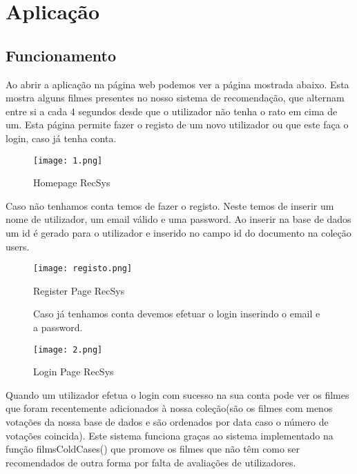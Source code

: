 \section{Aplicação}


\subsection{Funcionamento}

Ao abrir a aplicação na página web podemos ver a página mostrada abaixo. Esta mostra alguns filmes presentes no nosso sistema de recomendação, que alternam entre si a cada 4 segundos desde que o utilizador não tenha o rato em cima de um. Esta página permite fazer o registo de um novo utilizador ou que este faça o login, caso já tenha conta.\newline

\begin{figure}[H]
\centering
\texttt{[image: 1.png]}
\caption {Homepage RecSys}
\label {fig07}
\end{figure}

Caso não tenhamos conta temos de fazer o registo. Neste temos de inserir um nome de utilizador, um email válido e uma password.  Ao inserir na base de dados um id é gerado para o utilizador e inserido no campo id do documento na coleção users.\newline

\begin{figure}[H]
\centering
\texttt{[image: registo.png]}
\caption {Register Page RecSys}
\label {fig08}
\end{figure}

\begin{figure}[H]
Caso já tenhamos conta devemos efetuar o login inserindo o email e a password.\newline

\centering
\texttt{[image: 2.png]}
\caption {Login Page RecSys}
\label {fig09}
\end{figure}

Quando um utilizador efetua o login com sucesso na sua conta pode ver os filmes que foram recentemente adicionados à nossa coleção(são os filmes com menos votações da nossa base de dados e são ordenados por data caso o número de votações coincida). Este sistema funciona graças ao sistema implementado na função filmsColdCases() que promove os filmes que não têm como ser recomendados de outra forma por falta de avaliações de utilizadores.\newline


